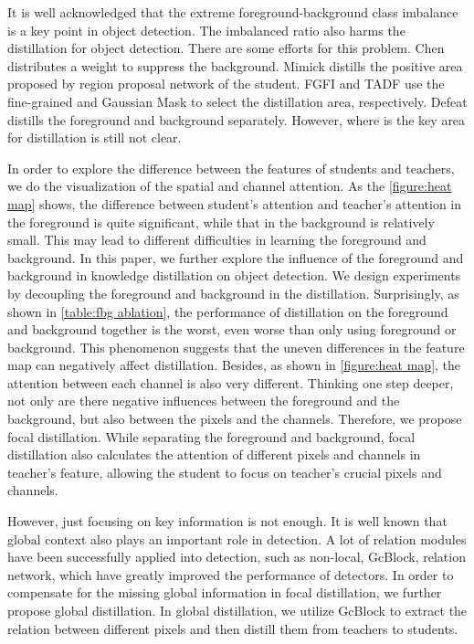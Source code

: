 \documentclass[10pt,twocolumn,letterpaper]{article}
\begin{document}
It is well acknowledged that the extreme foreground-background class imbalance is a key point in object detection\cite{lin2017focal}. The imbalanced ratio also harms the distillation for object detection. There are some efforts for this problem. Chen \etal~\cite{chen2017learning} distributes a weight to suppress the background. Mimick\cite{li2017mimicking} distills the positive area proposed by region proposal network of the student. FGFI\cite{wang2019distilling} and TADF\cite{sun2020distilling} use the fine-grained and Gaussian Mask to select the distillation area, respectively. Defeat\cite{guo2021distilling} distills the foreground and background separately. However, where is the key area for distillation is still not clear.

In order to explore the difference between the features of students and teachers, we do the visualization of the spatial and channel attention. As the \cref{figure:heat map} shows, the difference between student's attention and teacher's attention in the foreground is quite significant, while that in the background is relatively small. This may lead to different difficulties in learning the foreground and background. In this paper, we further explore the influence of the foreground and background in knowledge distillation on object detection. We design experiments by decoupling the foreground and background in the distillation. Surprisingly, as shown in \cref{table:fbg ablation}, the performance of distillation on the foreground and background together is the worst, even worse than only using foreground or background.  This phenomenon suggests that the uneven differences in the feature map can negatively affect distillation. Besides, as shown in \cref{figure:heat map}, the attention between each channel is also very different. Thinking one step deeper, not only are there negative influences between the foreground and the background, but also between the pixels and the channels. Therefore, we propose focal distillation. While separating the foreground and background, focal distillation also calculates the attention of different pixels and channels in teacher's feature, allowing the student to focus on teacher's crucial pixels and channels.

However, just focusing on key information is not enough. It is well known that global context also plays an important role in detection. A lot of relation modules have been successfully applied into detection, such as non-local\cite{wang2018non}, GcBlock\cite{cao2019gcnet}, relation network\cite{hu2018relation}, which have greatly improved the performance of detectors. In order to compensate for the missing global information in focal distillation, we further propose global distillation. In global distillation, we utilize GcBlock to extract the relation between different pixels and then distill them from teachers to students.
\end{document}
